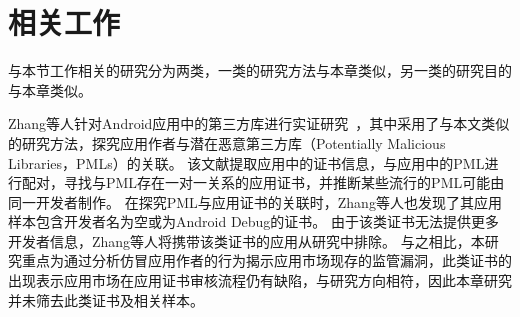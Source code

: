 

\section{相关工作}

与本节工作相关的研究分为两类，一类的研究方法与本章类似，另一类的研究目的与本章类似。

Zhang等人针对Android应用中的第三方库进行实证研究~\cite{zhang2020empirical}，其中采用了与本文类似的研究方法，探究应用作者与潜在恶意第三方库（Potentially Malicious Libraries，PMLs）的关联。
该文献提取应用中的证书信息，与应用中的PML进行配对，寻找与PML存在一对一关系的应用证书，并推断某些流行的PML可能由同一开发者制作。
在探究PML与应用证书的关联时，Zhang等人也发现了其应用样本包含开发者名为空或为Android Debug的证书。
由于该类证书无法提供更多开发者信息，Zhang等人将携带该类证书的应用从研究中排除。
与之相比，本研究重点为通过分析仿冒应用作者的行为揭示应用市场现存的监管漏洞，此类证书的出现表示应用市场在应用证书审核流程仍有缺陷，与研究方向相符，因此本章研究并未筛去此类证书及相关样本。

